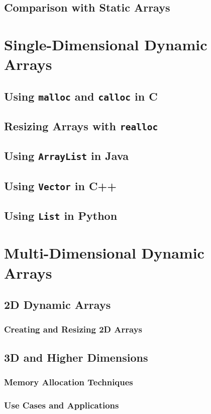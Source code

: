 \documentclass{book}
\begin{document}
	\subsection{Comparison with Static Arrays}
	
	\section{Single-Dimensional Dynamic Arrays}
	\subsection{Using \texttt{malloc} and \texttt{calloc} in C}
	\subsection{Resizing Arrays with \texttt{realloc}}
	\subsection{Using \texttt{ArrayList} in Java}
	\subsection{Using \texttt{Vector} in C++}
	\subsection{Using \texttt{List} in Python}
	
	\section{Multi-Dimensional Dynamic Arrays}
	\subsection{2D Dynamic Arrays}
	\subsubsection{Creating and Resizing 2D Arrays}
	\subsection{3D and Higher Dimensions}
	\subsubsection{Memory Allocation Techniques}
	\subsubsection{Use Cases and Applications}
	
\end{document}
